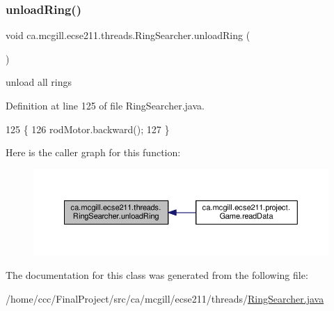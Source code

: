 \mbox{\label{classca_1_1mcgill_1_1ecse211_1_1threads_1_1_ring_searcher_a105b1aaaca38a9466c125318175f192c}} 
\subsubsection{\texorpdfstring{unload\+Ring()}{unloadRing()}}
{\footnotesize\ttfamily void ca.\+mcgill.\+ecse211.\+threads.\+Ring\+Searcher.\+unload\+Ring (\begin{DoxyParamCaption}{ }\end{DoxyParamCaption})}

unload all rings 

Definition at line 125 of file Ring\+Searcher.\+java.


\begin{DoxyCode}
125                            \{
126     rodMotor.backward();
127   \}
\end{DoxyCode}
Here is the caller graph for this function\+:
\nopagebreak
\begin{figure}[H]
\begin{center}
\leavevmode
\includegraphics[width=350pt]{classca_1_1mcgill_1_1ecse211_1_1threads_1_1_ring_searcher_a105b1aaaca38a9466c125318175f192c_icgraph}
\end{center}
\end{figure}


The documentation for this class was generated from the following file\+:\begin{DoxyCompactItemize}
\item 
/home/ccc/\+Final\+Project/src/ca/mcgill/ecse211/threads/\hyperlink{_ring_searcher_8java}{Ring\+Searcher.\+java}\end{DoxyCompactItemize}
